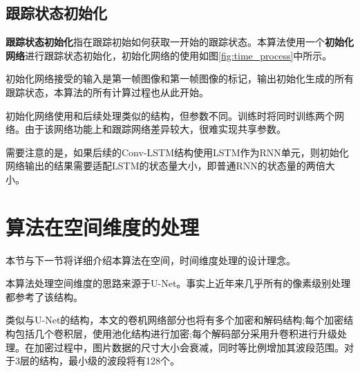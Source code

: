 \subsection{跟踪状态初始化}
\textbf{跟踪状态初始化}指在跟踪初始如何获取一开始的跟踪状态。本算法使用一个\textbf{初始化网络}进行跟踪状态初始化，初始化网络的使用如图\ref{fig:time_process}中所示。
\par
初始化网络接受的输入是第一帧图像和第一帧图像的标记，输出初始化生成的所有跟踪状态，本算法的所有计算过程也从此开始。
\par
初始化网络使用和后续处理类似的结构，但参数不同。训练时将同时训练两个网络。由于该网络功能上和跟踪网络差异较大，很难实现共享参数。
\par
需要注意的是，如果后续的Conv-LSTM结构使用LSTM作为RNN单元，则初始化网络输出的结果需要适配LSTM的状态量大小，即普通RNN的状态量的两倍大小。

\section{算法在空间维度的处理}
本节与下一节将详细介绍本算法在空间，时间维度处理的设计理念。
\par
本算法处理空间维度的思路来源于U-Net\supercite{ronneberger2015u}。事实上近年来几乎所有的像素级别处理都参考了该结构。
\par
类似与U-Net的结构，本文的卷机网络部分也将有多个加密和解码结构;每个加密结构包括几个卷积层，使用池化结构进行加密;每个解码部分采用升卷积进行升级处理。在加密过程中，图片数据的尺寸大小会衰减，同时等比例增加其波段范围。对于3层的结构，最小级的波段将有128个。

